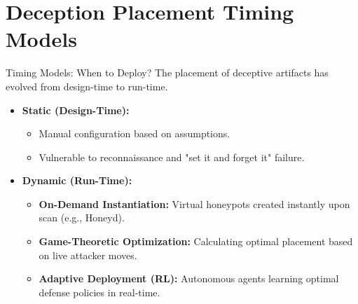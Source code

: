 \documentclass[12pt, aspectratio=169]{beamer}
\begin{document}
\section{Deception Placement Timing Models}
\begin{frame}{Timing Models: When to Deploy?}
    The placement of deceptive artifacts has evolved from design-time to run-time.

    \begin{itemize}
        \item \textbf{Static (Design-Time):}
              \begin{itemize}
                  \item Manual configuration based on assumptions.
                  \item Vulnerable to reconnaissance and "set it and forget it" failure.
              \end{itemize}

        \item \textbf{Dynamic (Run-Time):}
              \begin{itemize}
                  \item \textbf{On-Demand Instantiation:} Virtual honeypots created instantly upon scan (e.g., Honeyd).
                  \item \textbf{Game-Theoretic Optimization:} Calculating optimal placement based on live attacker moves.
                  \item \textbf{Adaptive Deployment (RL):} Autonomous agents learning optimal defense policies in real-time.
              \end{itemize}
    \end{itemize}
\end{frame}
\end{document}
